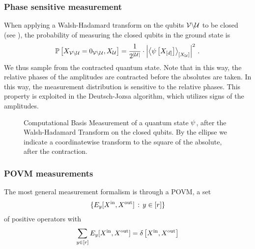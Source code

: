 \subsubsection{Phase sensitive measurement}

When applying a Walsh-Hadamard transform on the qubits $\mathcal{V}\backslash\mathcal{U}$ to be closed (see ), the probability of measuring the closed qubits in the ground state is %
\begin{align*}
    \mathbb{P}\left[X_{\mathcal{V}\backslash\mathcal{U}}=0_{\mathcal{V}\backslash\mathcal{U}},X_{\mathcal{U}}\right]
    = \frac{1}{2^{\left|\mathcal{U}\right|}} \cdot \left|\left\langle \psi\left[X_{[d]}\right]\right\rangle_{\left[ X_{\mathcal{U}} \right]}\right|^2 \, .
\end{align*}
We thus sample from the contracted quantum state.
Note that in this way, the relative phases of the amplitudes are contracted before the absolutes are taken.
In this way, the measurement distribution is sensitive to the relative phases.
This property is exploited in the Deutsch-Jozsa algorithm, which utilizes signs of the amplitudes.

\begin{figure}
    \begin{center}
        
    \end{center}
    \caption{Computational Basis Measurement of a quantum state $\psi$, after the Walsh-Hadamard Transform on the closed qubits.
    By the ellipse we indicate a coordinatewise transform to the square of the absolute, after the contraction.}
    \label{fig:phaseContractionMeasurement}
\end{figure}

\subsubsection{POVM measurements}

The most general measurement formalism is through a POVM, a set
\begin{align*}
    \{E_y[X^{\mathrm{in}},X^{\mathrm{out}}] \,:\, y\in[r]\}
\end{align*}
of positive operators with
\begin{align*}
    \sum_{y\in[r]} E_y[X^{\mathrm{in}},X^{\mathrm{out}}]
    = \delta\left[X^{\mathrm{in}},X^{\mathrm{out}}\right]
\end{align*}

